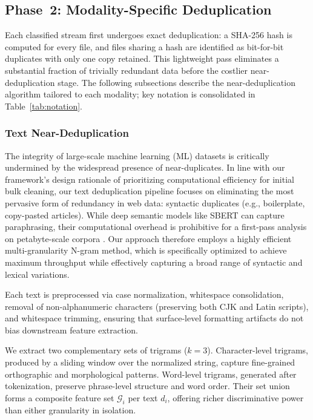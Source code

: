 \documentclass[conference]{IEEEtran}
\begin{document}
\subsection{Phase~2: Modality-Specific Deduplication}

Each classified stream first undergoes exact deduplication: a SHA-256 hash is computed for every file, and files sharing a hash are identified as bit-for-bit duplicates with only one copy retained. This lightweight pass eliminates a substantial fraction of trivially redundant data before the costlier near-deduplication stage. The following subsections describe the near-deduplication algorithm tailored to each modality; key notation is consolidated in Table~\ref{tab:notation}.

\subsubsection{Text Near-Deduplication}

The integrity of large-scale machine learning (ML) datasets is critically undermined by the widespread presence of near-duplicates. In line with our framework's design rationale of prioritizing computational efficiency for initial bulk cleaning, our text deduplication pipeline focuses on eliminating the most pervasive form of redundancy in web data: syntactic duplicates (e.g., boilerplate, copy-pasted articles). While deep semantic models like SBERT \cite{reimers2019sentencebertsentenceembeddingsusing} can capture paraphrasing, their computational overhead is prohibitive for a first-pass analysis on petabyte-scale corpora \cite{lee2022deduplicating}. Our approach therefore employs a highly efficient multi-granularity N-gram method, which is specifically optimized to achieve maximum throughput while effectively capturing a broad range of syntactic and lexical variations.

Each text is preprocessed via case normalization, whitespace consolidation, removal of non-alphanumeric characters (preserving both CJK and Latin scripts), and whitespace trimming, ensuring that surface-level formatting artifacts do not bias downstream feature extraction.

We extract two complementary sets of trigrams ($k{=}3$). Character-level trigrams, produced by a sliding window over the normalized string, capture fine-grained orthographic and morphological patterns. Word-level trigrams, generated after tokenization, preserve phrase-level structure and word order. Their set union forms a composite feature set $\mathcal{G}_i$ per text $d_i$, offering richer discriminative power than either granularity in isolation.
\end{document}
